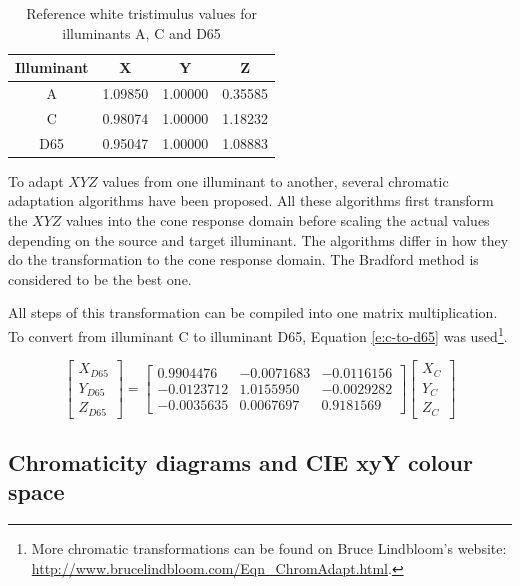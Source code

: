 \begin{table}
\begin{center}
\begin{tabular}{|c|c|c|c|}
\hline
Illuminant & X & Y & Z \\
\hline
A & 1.09850 & 1.00000 & 0.35585 \\
C & 0.98074 & 1.00000 & 1.18232 \\
D65 & 0.95047 & 1.00000 & 1.08883 \\
\hline
\end{tabular}
\end{center}
\caption{Reference white tristimulus values for illuminants A, C and D65}
\label{t:reference-whites}
\end{table}

To adapt $XYZ$ values from one illuminant to another, several
chromatic adaptation algorithms have been proposed. All these
algorithms first transform the $XYZ$ values into the cone response
domain before scaling the actual values depending on the source and
target illuminant. The algorithms differ in how they do the
transformation to the cone response domain. The Bradford method is
considered to be the best one.

All steps of this transformation can be compiled into one matrix
multiplication. To convert from illuminant C to illuminant D65,
Equation \ref{e:c-to-d65} was used\footnote{More chromatic
  transformations can be found on Bruce Lindbloom's website:\\
  \url{http://www.brucelindbloom.com/Eqn_ChromAdapt.html}.}.

\begin{equation}
\begin{bmatrix}
  X_{D65} \\ Y_{D65} \\ Z_{D65}
\end{bmatrix}
=
\begin{bmatrix}
 0.9904476 & -0.0071683 & -0.0116156 \\
-0.0123712 & 1.0155950 & -0.0029282 \\
-0.0035635  & 0.0067697 & 0.9181569
\end{bmatrix}
\begin{bmatrix}
  X_{C} \\ Y_{C} \\ Z_{C}
\end{bmatrix}
\label{e:c-to-d65}
\end{equation}

\subsection{Chromaticity diagrams and CIE xyY colour space}


